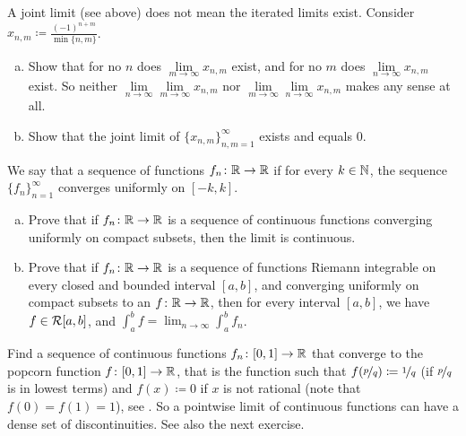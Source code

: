 \begin{exercise}
A joint limit (see above) does not mean the iterated limits exist.
Consider $x_{n,m} \coloneqq \frac{{(-1)}^{n+m}}{\min \{n,m \}}$.
\begin{enumerate}[a)]
\item
Show that for no $n$ does
$\lim\limits_{m \to \infty} x_{n,m}$ exist, and for no $m$
does 
$\lim\limits_{n \to \infty} x_{n,m}$ exist.  So neither
$\lim\limits_{n\to\infty}\lim\limits_{m \to \infty} x_{n,m}$ nor
$\lim\limits_{m\to\infty}\lim\limits_{n \to \infty} x_{n,m}$ makes any sense
at all.
\item
Show that the joint limit of $\{ x_{n,m} \}_{n,m=1}^\infty$ exists and equals 0.
\end{enumerate}
\end{exercise}

\begin{exercise}
We say that a sequence of functions $f_n \colon {\mathbb{R}} \to {\mathbb{R}}$
\emph{}
if for every $k \in {\mathbb{N}}$,
the sequence $\{ f_n \}_{n=1}^\infty$ converges uniformly on $[-k,k]$.
\begin{enumerate}[a)]
\item
Prove that if $f_n \colon {\mathbb{R}} \to {\mathbb{R}}$ is a sequence of
continuous functions converging uniformly on compact subsets, then
the limit is continuous.
\item 
Prove that if $f_n \colon {\mathbb{R}} \to {\mathbb{R}}$ is a sequence of
functions Riemann integrable on every closed and bounded interval $[a,b]$,
and converging uniformly on compact subsets to an $f \colon {\mathbb{R}} \to {\mathbb{R}}$,
then for every interval $[a,b]$, we have $f \in {\mathcal{R}}[a,b]$, and
$\int_a^b f = \lim_{n\to\infty} \int_a^b f_n$.
\end{enumerate}
\end{exercise}

\begin{exercise}[Challenging]
Find a sequence of continuous functions $f_n \colon [0,1] \to {\mathbb{R}}$ that
converge to the popcorn function $f \colon [0,1] \to {\mathbb{R}}$, that is the
function such that $f(\nicefrac{p}{q}) \coloneqq \nicefrac{1}{q}$ (if $\nicefrac{p}{q}$
is in lowest terms) and $f(x) \coloneqq 0$ if $x$ is not rational (note
that $f(0) = f(1) = 1$),
see .
So a pointwise limit of continuous functions can have a dense set of
discontinuities.  See also the next exercise.
\end{exercise}

